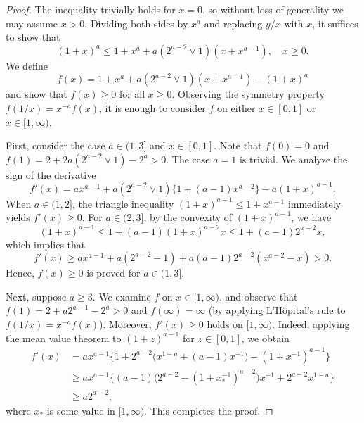 \documentclass[10pt,a4paper]{amsart}
\begin{document}
\begin{proof}
The inequality trivially holds for $x=0$, so without loss of generality we may assume $x>0$. 
Dividing both sides by $x^a$ and replacing $y/x$ with $x$, it suffices to show that
\[
(1+x)^a \le 1+x^a + a(2^{a-2}\vee 1) (x+x^{a-1}),\quad x\ge 0.
\]
We define 
\[
f(x) = 1+ x^a +a(2^{a-2}\vee 1)(x+x^{a-1}) -(1+x)^a
\]
and show that $f(x)\ge 0$ for all $x\ge 0$. Observing the symmetry property 
$f(1/x)=x^{-a}f(x)$, it is enough to consider $f$ on either $x\in [0,1]$ or $x\in [1,\infty)$. 

First, consider the case $a\in (1,3]$ and $x\in [0,1]$. Note that $f(0)=0$ and $f(1)=2+2a(2^{a-2}\vee 1)-2^a>0$. The case $a=1$ is trivial. 
We analyze the sign of the derivative
\[
f'(x) = a x^{a-1} + a(2^{a-2}\vee 1)\{1+(a-1) x^{a-2}\}-a(1+x)^{a-1}. 
\]
When $a \in (1,2]$, the triangle inequality $(1+x)^{a-1} \le 1+ x^{a-1}$ immediately yields $f'(x) \ge 0$. 
For $a \in (2,3]$, by the convexity of $(1+x)^{a-1}$, we have 
\[
(1+x)^{a-1} \le 1 +(a-1)(1+x)^{a-2} x \le 1+(a-1) 2^{a-2} x,
\]
which implies that
\[
f'(x) \ge a x^{a-1}+ a(2^{a-2}-1)+a(a-1) 2^{a-2} (x^{a-2}-x) >0.
\]
Hence, $f(x)\ge 0$ is proved for $a\in (1,3]$.

Next, suppose $a \ge 3$. We examine $f$ on $x\in [1,\infty)$, and observe that 
$f(1)= 2+a2^{a-1}-2^a>0$ and $f(\infty)=\infty$ (by applying L'H\^opital's rule to $f(1/x)=x^{-a}f(x)$). 
Moreover, $f'(x)\ge 0$ holds on $[1,\infty)$. Indeed, applying the mean value theorem to $(1+z)^{a-1}$ for $z\in [0,1]$, we obtain 
\begin{align*}
f'(x) &= a x^{a-1} \Big\{
1+2^{a-2}\big(x^{1-a}+(a-1)x^{-1}\big)-(1+x^{-1})^{a-1}
\Big\} \\
&\ge a x^{a-1} \Big\{
(a-1) \big(2^{a-2} -(1+x_\ast^{-1})^{a-2}\big)x^{-1} + 2^{a-2}x^{1-a}
\Big\} \\
& \ge a 2^{a-2}, 
\end{align*} 
where $x_\ast$ is some value in $[1,\infty)$. This completes the proof.
\end{proof}
\end{document}
